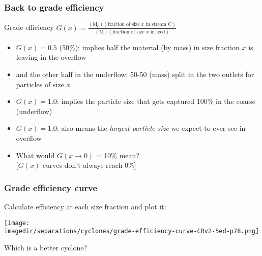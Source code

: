 \begin{frame}\frametitle{Back to grade efficiency}
	\begin{exampleblock}{Grade efficiency}
		$G(x) = \displaystyle \frac{(\text{M}_\text{c})(\text{fraction of size $x$ in stream C})}{(\text{M})(\text{fraction of size $x$ in feed})}$
	\end{exampleblock}
	\begin{itemize}
		\item	$G(x) = 0.5$ (50\%): implies half the material (by mass) in size fraction $x$ is leaving in the overflow
		\item	and the other half in the underflow; 50-50 (mass) split in the two outlets for particles of size $x$
		\item	$G(x) = 1.0$: implies the particle size that gets captured 100\%  in the coarse (underflow)
		\item	$G(x) = 1.0$: also means the \emph{largest particle size} we expect to ever see in overflow
		\item	\adv What would $G(x \rightarrow 0)$ = 10\% mean? \\{\scriptsize [$G(x)$ curves don't always reach 0\%]}
	\end{itemize}	
\end{frame}

\begin{frame}\frametitle{Grade efficiency curve}
	Calculate efficiency at each size fraction and plot it:
	\begin{center}
		\texttt{[image: \\imagedir/separations/cyclones/grade-efficiency-curve-CRv2-5ed-p78.png]}
	\end{center}
	Which is a better cyclone?
\end{frame}

